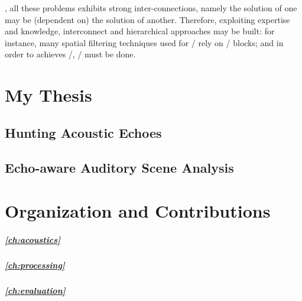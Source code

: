 


, all these problems exhibits strong inter-connections,
namely the solution of one may be (dependent on) the solution of another.
Therefore, exploiting expertise and knowledge,
interconnect and hierarchical approaches may be built:
for instance, many spatial filtering techniques used for \SE/ rely on \SSL/ blocks;
and in order to achieves \RooGE/, \AER/ must be done.


\section{My Thesis}
\subsection{Hunting Acoustic Echoes}
\subsection{Echo-aware Auditory Scene Analysis}


\section{Organization and Contributions}
\subparagraph{\cref{ch:acoustics}}
\subparagraph{\cref{ch:processing}}
\subparagraph{\cref{ch:evaluation}}

